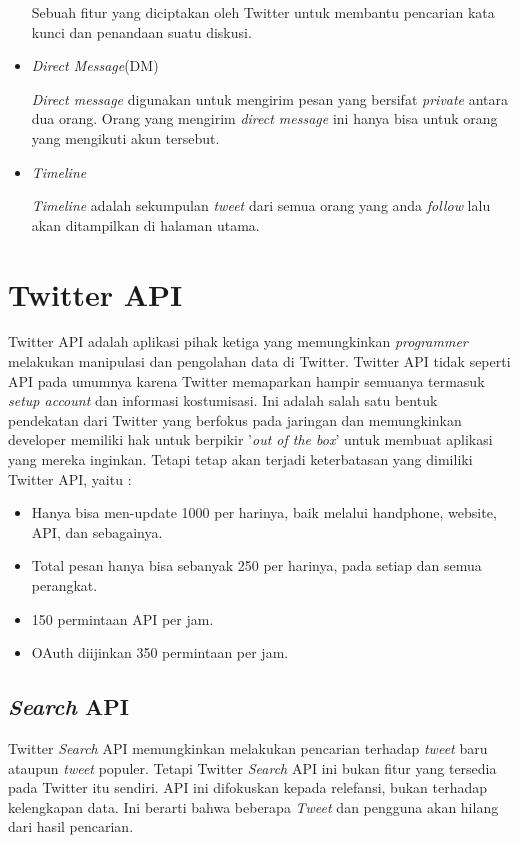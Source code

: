 \begin{itemize}
	Sebuah fitur yang diciptakan oleh Twitter untuk membantu pencarian kata kunci dan penandaan suatu diskusi.
	
	\item \textit{Direct Message}(DM)
	
	\textit{Direct message} digunakan untuk mengirim pesan yang bersifat \textit{private} antara dua orang. Orang yang mengirim \textit{direct message} ini hanya bisa untuk orang yang mengikuti akun tersebut.
	\item \textit{Timeline}
	
	\textit{Timeline} adalah sekumpulan \textit{tweet} dari semua orang yang anda \textit{follow} lalu akan ditampilkan di halaman utama.
\end{itemize}


\section{Twitter API}
Twitter API adalah aplikasi pihak ketiga yang memungkinkan \textit{programmer} melakukan manipulasi dan pengolahan data di Twitter. Twitter API tidak seperti API pada umumnya karena Twitter memaparkan hampir semuanya termasuk \textit{setup account} dan informasi kostumisasi\cite{Twitter}. Ini adalah salah satu bentuk pendekatan dari Twitter yang berfokus pada jaringan dan memungkinkan developer memiliki hak untuk berpikir '\textit{out of the box}' untuk membuat aplikasi yang mereka inginkan. Tetapi tetap akan terjadi keterbatasan yang dimiliki Twitter API, yaitu :
\begin{itemize}
	\item Hanya bisa men-update 1000 per harinya, baik melalui handphone, website, API, dan sebagainya.
	\item Total pesan hanya bisa sebanyak 250 per harinya, pada setiap dan semua perangkat.
	\item 150 permintaan API per jam.
	\item OAuth diijinkan 350 permintaan per jam.
\end{itemize}

\subsection{\textit{Search} API}

Twitter \textit{Search} API memungkinkan melakukan pencarian terhadap \textit{tweet} baru ataupun \textit{tweet} populer. Tetapi Twitter \textit{Search} API ini bukan fitur yang tersedia pada Twitter itu sendiri. API ini difokuskan kepada relefansi, bukan terhadap kelengkapan data. Ini berarti bahwa beberapa \textit{Tweet} dan pengguna akan hilang dari hasil pencarian.

